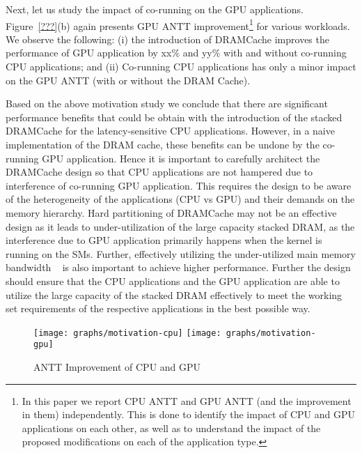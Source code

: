 Next, let us study the impact of co-running on the GPU applications.  Figure~\ref{???}(b) again presents GPU ANTT improvement\footnote{In this 
paper we report CPU ANTT and GPU ANTT (and the improvement in them) independently. This is done to identify the impact of CPU 
and GPU applications on each other, as well as to understand the impact of the proposed modifications on each of the application
type.} for various workloads. 
We observe the following: 
(i)  the introduction of DRAMCache improves the performance of GPU application by xx\% and yy\% with and without co-running CPU applications;
and (ii) Co-running CPU applications has only a minor impact on the GPU ANTT (with or without the DRAM Cache). 


Based on the above motivation study we conclude that there are significant performance benefits that could be obtain 
with the introduction of the stacked DRAMCache for the latency-sensitive CPU applications. However, in a naive implementation
of the DRAM cache, these benefits can be undone by the co-running GPU application.  Hence it is important to carefully 
architect the DRAMCache design so that CPU applications are not hampered due to interference of co-running GPU application.
This requires the design to be aware of the heterogeneity of the applications (CPU vs GPU) and their demands on the 
memory hierarchy.  Hard partitioning of DRAMCache may not be an effective design as it leads to under-utilization of the large capacity 
stacked DRAM, as the interference due to GPU application primarily happens when the kernel is running on the SMs. 
Further, effectively utilizing the under-utilized main memory bandwidth ~\cite{Nagendra's Memsys paper, Mainak's HPCA paper}
is also important to achieve higher performance.  Further the design should ensure that the CPU applications and the 
GPU application are able to utilize the large capacity of the stacked DRAM effectively to meet the working set 
requirements of the respective applications in the best possible way.

\begin{figure}[htbp]
   \texttt{[image: graphs/motivation-cpu]}
   \texttt{[image: graphs/motivation-gpu]}
   \caption{ANTT Improvement of CPU and GPU}
   \label{fig:motivation}
\end{figure}
